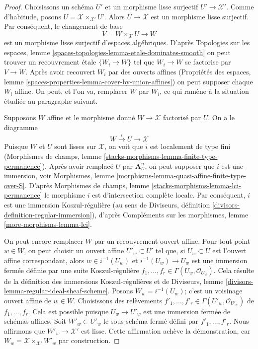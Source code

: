 \begin{proof}
Choisissons un schéma $U'$ et un morphisme lisse surjectif $U' \to \mathcal{X}'$.
Comme d'habitude, posons $U = \mathcal{X} \times_{\mathcal{X}'} U'$. Alors
$U \to \mathcal{X}$ est un morphisme lisse surjectif. Par conséquent, le changement de base
$$
V = W \times_{\mathcal{X}} U \longrightarrow W
$$
est un morphisme lisse surjectif d'espaces algébriques.
D'après Topologies sur les espaces, lemme
\ref{spaces-topologies-lemma-etale-dominates-smooth}
on peut trouver un recouvrement \'etale $\{W_i \to W\}$ tel
que $W_i \to W$ se factorise par $V \to W$.
Après avoir recouvert $W_i$ par des ouverts affines (Propriétés des espaces, lemme
\ref{spaces-properties-lemma-cover-by-union-affines})
on peut supposer chaque $W_i$ affine. On peut, et l'on va, remplacer $W$ par $W_i$,
ce qui ramène à la situation étudiée au paragraphe suivant.

\medskip\noindent
Supposons $W$ affine et le morphisme donné $W \to \mathcal{X}$ factorisé
par $U$. On a le diagramme
$$
W \xrightarrow{i} U \to \mathcal{X}
$$
Puisque $W$ et $U$ sont lisses sur $\mathcal{X}$, on voit que
$i$ est localement de type fini (Morphismes de champs, lemme
\ref{stacks-morphisms-lemma-finite-type-permanence}).
Après avoir remplacé $U$ par $\mathbf{A}^n_U$, on peut supposer
que $i$ est une immersion, voir
Morphismes, lemme \ref{morphisms-lemma-quasi-affine-finite-type-over-S}.
D'après Morphismes de champs,
lemme \ref{stacks-morphisms-lemma-lci-permanence}
le morphisme $i$ est d'intersection complète locale.
Par conséquent, $i$ est une immersion Koszul-régulière (au sens de
Diviseurs, définition \ref{divisors-definition-regular-immersion}),
d'après Compléments sur les morphismes, lemme \ref{more-morphisms-lemma-lci}.

\medskip\noindent
On peut encore remplacer $W$ par un recouvrement ouvert affine.
Pour tout point $w \in W$, on peut choisir un ouvert affine
$U'_w \subset U'$ tel que, si $U_w \subset U$ est
l'ouvert affine correspondant, alors $w \in i^{-1}(U_w)$ et
$i^{-1}(U_w) \to U_w$ est une immersion fermée définie
par une suite Koszul-régulière
$f_1, \ldots, f_r \in \Gamma(U_w, \mathcal{O}_{U_w})$.
Cela résulte de la définition des immersions Koszul-régulières
et de Diviseurs, lemme \ref{divisors-lemma-regular-ideal-sheaf-scheme}.
Posons $W_w = i^{-1}(U_w)$; c'est un voisinage ouvert affine
de $w \in W$.
Choisissons des relèvements $f'_1, \ldots, f'_r \in \Gamma(U'_w, \mathcal{O}_{U'_w})$
de $f_1, \ldots, f_r$. Cela est possible puisque $U_w \to U'_w$
est une immersion fermée de schémas affines.
Soit $W'_w \subset U'_w$ le sous-schéma fermé défini par
$f'_1, \ldots, f'_r$.
Nous affirmons que $W'_w \to \mathcal{X}'$ est lisse.
Cette affirmation achève la démonstration, car
$W_w = \mathcal{X} \times_{\mathcal{X}'} W'_w$
par construction.


\end{proof}
